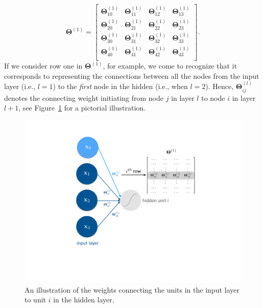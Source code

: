 \begin{equation*}
\bm{\Theta}^{(1)} = \left[\begin{array}{cccc}
\bm{\Theta}^{(1)}_{10} & \bm{\Theta}^{(1)}_{11} & \bm{\Theta}^{(1)}_{12} & \bm{\Theta}^{(1)}_{13} \\
\bm{\Theta}^{(1)}_{20} & \bm{\Theta}^{(1)}_{21} & \bm{\Theta}^{(1)}_{22} & \bm{\Theta}^{(1)}_{23} \\
\bm{\Theta}^{(1)}_{30} & \bm{\Theta}^{(1)}_{31} & \bm{\Theta}^{(1)}_{32} & \bm{\Theta}^{(1)}_{33} \\
\bm{\Theta}^{(1)}_{40} & \bm{\Theta}^{(1)}_{41} & \bm{\Theta}^{(1)}_{42} & \bm{\Theta}^{(1)}_{43} \\
\end{array}
\right].
\end{equation*} 
If we consider row one in $\bm{\Theta}^{(1)}$, for example, we come to recognize that it corresponds to representing the connections between all the nodes from the input layer (i.e., $l=1$) to the \emph{first} node in the hidden (i.e., when $l=2$). Hence, $\bm{\Theta}^{(l)}_{ij}$ denotes the connecting weight initiating from node $j$ in layer $l$ to node $i$ in layer $l+1$, see Figure~\ref{Fig:FigThree} for a pictorial illustration. 

\begin{figure}[h!]
\label{Fig:FigThree}
\centering 
\includegraphics[trim = 10em 10em 10em 1em, clip, scale=.4]{OneUnitTheta}
\caption{An illustration of the weights connecting the units in the input layer to unit $i$ in the hidden layer.}
\end{figure}
